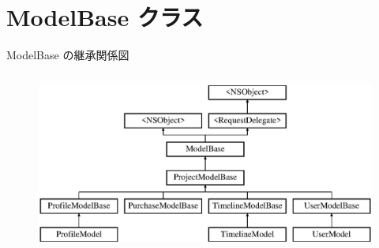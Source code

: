 \hypertarget{interface_model_base}{}\section{Model\+Base クラス}
\label{interface_model_base}
Model\+Base の継承関係図\begin{figure}[H]
\begin{center}
\leavevmode
\includegraphics[height=6.000000cm]{interface_model_base}
\end{center}
\end{figure}
